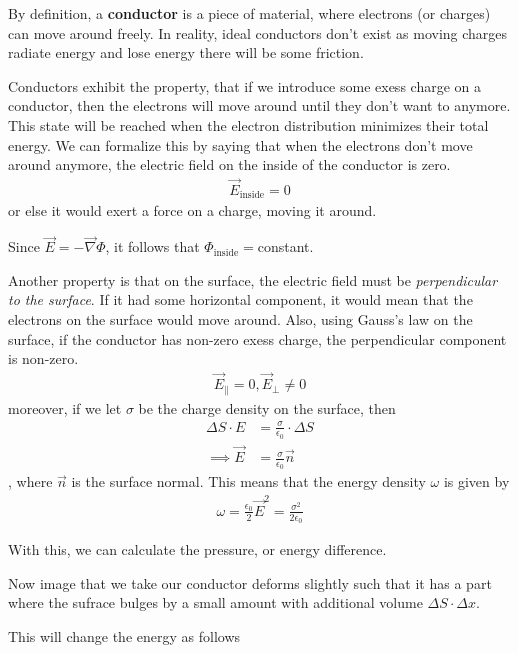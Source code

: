 \begin{ex}
  By definition, a \textbf{conductor} is a piece of material, where electrons (or charges) can move around freely.
In reality, ideal conductors don't exist as moving charges radiate energy and lose energy there will be some friction.

Conductors exhibit the property, that if we introduce some exess charge on a conductor, then the electrons will move around until they don't want to anymore. 
This state will be reached when the electron distribution minimizes their total energy.
We can formalize this by saying that when the electrons don't move around anymore, the electric field on the inside of the conductor is zero.
\begin{align*}
  \vec{E}_{\text{inside}} = 0
\end{align*}
or else it would exert a force on a charge, moving it around.

Since $\vec{E} = - \vec{\nabla} \Phi$, it follows that $\Phi_{\text{inside}} = $constant.

Another property is that on the surface, the electric field must be \emph{perpendicular to the surface}.
If it had some horizontal component, it would mean that the electrons on the surface would move around.
Also, using Gauss's law on the surface, if the conductor has non-zero exess charge, the perpendicular component is non-zero.
\begin{align*}
  \vec{E}_{\parallel} = 0, \vec{E}_{\bot} \neq 0
\end{align*}
moreover, if we let $\sigma$ be the charge density on the surface, then
\begin{align*}
  \Delta S \cdot E &= \frac{\sigma}{\epsilon_0} \cdot \Delta S\\
  \implies \vec{E} &= \frac{\sigma}{\epsilon_0} \vec{n}
\end{align*}
, where $\vec{n}$ is the surface normal.
This means that the energy density $\omega$ is given by
\begin{align*}
  \omega = \frac{\epsilon_0}{2} \vec{E}^{2} = \frac{\sigma^{2}}{2 \epsilon_0}
\end{align*}

With this, we can calculate the pressure, or energy difference.

Now image that we take our conductor deforms slightly such that it has a part where the sufrace bulges by a small amount with additional volume $\Delta S \cdot \Delta x$.

This will change the energy as follows


\end{ex}
